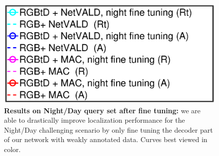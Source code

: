 \begin{figure}
	\includegraphics[trim={100 58 165 300},clip,width=0.4\linewidth]{plot/fig/legend_night}
	\caption{\label{fig:ft_night} \textbf{Results on Night/Day query set after fine tuning:} we are able to drastically improve localization performance for the Night/Day challenging scenario by only fine tuning the decoder part of our network with weakly annotated data. Curves best viewed in color.}
\end{figure}
